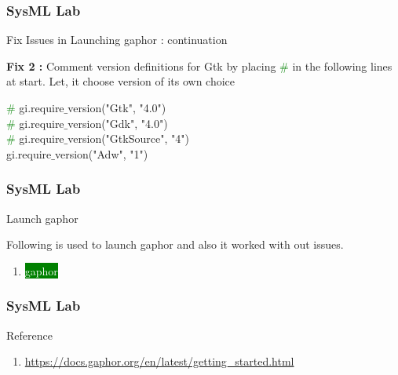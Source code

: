 \newpage
\begin{frame}
\frametitle{SysML Lab}
\begin{block}{Fix Issues in Launching gaphor : continuation }
 
  

{\bf Fix 2 : } 
Comment version definitions for Gtk by 
placing  \textcolor{green}{ \#  } in the following  lines at start.  Let,  it choose version of its own choice


\textcolor{green}{ \#  } gi.require$\_$version("Gtk", "4.0") \\
\textcolor{green}{ \#  } gi.require$\_$version("Gdk", "4.0") \\
\textcolor{green}{ \#  } gi.require$\_$version("GtkSource", "4") \\
gi.require$\_$version("Adw", "1") \\
\end{block}
\end{frame}



\newpage
\begin{frame}
\frametitle{SysML Lab}
\begin{block}{Launch gaphor }

Following is used to launch gaphor and also it worked  with out issues.

\begin{enumerate} 
\item    \colorbox{green}{ \textcolor{white}{ gaphor } }
\end{enumerate}

\end{block}
\end{frame}




\newpage

\begin{frame}
\frametitle{SysML Lab}
\begin{block}{Reference }

\begin{enumerate} 
\item    \url{https://docs.gaphor.org/en/latest/getting_started.html }
\end{enumerate}


\end{block}
\end{frame}



 


